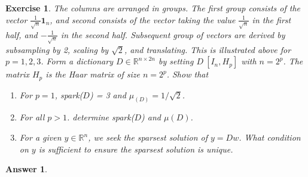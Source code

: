 \documentclass[12pt]{article}
\theoremstyle{colon}
\newtheorem{exercise}{Exercise}
\newtheorem*{answer}{Answer}
\begin{document}
\begin{exercise}
  The columns are arranged in groups. The first group consists of the vector $\frac{1}{\sqrt{n}} \bm{1}_n$, and second consists of the vector taking the value $\frac{1}{\sqrt{n}}$ in the first half, and $-\frac{1}{\sqrt{n}}$ in the second half. Subsequent group of vectors are derived by subsampling by 2, scaling by $\sqrt{2}$, and translating. This is illustrated above for $p = 1, 2, 3$. Form a dictionary $D \in \mathbb{R}^{n \times 2n}$ by setting $D \ [I_n, H_p]$ with $n = 2^p$. The matrix $H_p$ is the Haar matrix of size $n = 2^p$. Show that
  \begin{enumerate}[label=\alph*)]
    \item For $p = 1$, spark($D$) = 3 and $\mu_(D) = 1/\sqrt{2}$.
    \item For all $p > 1$. determine spark($D$) and $\mu(D)$.
    \item For a given $y \in \mathbb{R}^n$, we seek the sparsest solution of $y = Dw$. What condition on $y$ is sufficient to ensure the sparsest solution is unique.
  \end{enumerate}
\end{exercise}

\begin{answer}

\end{answer}
\end{document}
